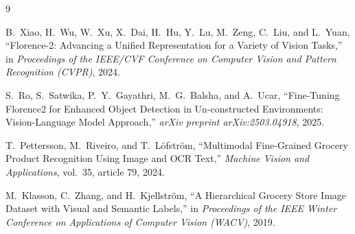 \documentclass[11pt]{article}
\begin{document}
\begin{thebibliography}{9}

B.~Xiao, H.~Wu, W.~Xu, X.~Dai, H.~Hu, Y.~Lu, M.~Zeng, C.~Liu, and L.~Yuan,
``Florence-2: Advancing a Unified Representation for a Variety of Vision Tasks,''
in \textit{Proceedings of the IEEE/CVF Conference on Computer Vision and Pattern Recognition (CVPR)}, 2024.

S.~Ro, S.~Satwika, P.~Y.~Gayathri, M.~G.~Balsha, and A.~Ucar,
``Fine-Tuning Florence2 for Enhanced Object Detection in Un-constructed Environments: Vision-Language Model Approach,''
\textit{arXiv preprint arXiv:2503.04918}, 2025.

T.~Pettersson, M.~Riveiro, and T.~L\"ofstr\"om,
``Multimodal Fine-Grained Grocery Product Recognition Using Image and OCR Text,''
\textit{Machine Vision and Applications}, vol.~35, article 79, 2024.

M.~Klasson, C.~Zhang, and H.~Kjellstr\"om,
``A Hierarchical Grocery Store Image Dataset with Visual and Semantic Labels,''
in \textit{Proceedings of the IEEE Winter Conference on Applications of Computer Vision (WACV)}, 2019.

\end{thebibliography}
\end{document}
